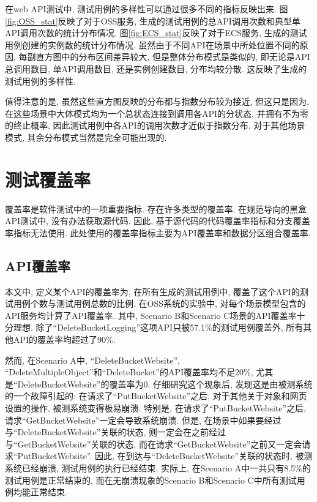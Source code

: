         在web API测试中, 测试用例的多样性可以通过很多不同的指标反映出来. 图\ref{fig:OSS_stat}反映了对于OSS服务, 生成的测试用例的总API调用次数和典型单API调用次数的统计分布情况. 图\ref{fig:ECS_stat}反映了对于ECS服务, 生成的测试用例创建的实例数的统计分布情况. 虽然由于不同API在场景中所处位置不同的原因, 每副直方图中的分布区间差异较大, 但是整体分布模式是类似的, 即无论是API总调用数目, 单API调用数目, 还是实例创建数目, 分布均较分散. 这反映了生成的测试用例的多样性.
        
        值得注意的是, 虽然这些直方图反映的分布都与指数分布较为接近, 但这只是因为, 在这些场景中大体模式均为一个总状态连接到调用各API的分状态, 并拥有不为零的终止概率, 因此测试用例中各API的调用次数才近似于指数分布. 对于其他场景模式, 其余分布模式当然是完全可能出现的.

    \section{测试覆盖率}
        覆盖率是软件测试中的一项重要指标. 存在许多类型的覆盖率. 在规范导向的黑盒API测试中, 没有办法获取源代码. 因此, 基于源代码的代码覆盖率指标和分支覆盖率指标无法使用. 此处使用的覆盖率指标主要为API覆盖率和数据分区组合覆盖率.
        
        \subsection{API覆盖率}
        
            本文中, 定义某个API的覆盖率为, 在所有生成的测试用例中, 覆盖了这个API的测试用例个数与测试用例总数的比例. 在OSS系统的实验中, 对每个场景模型包含的API服务均计算了API覆盖率. 其中, Scenario B和Scenario C场景的API覆盖率十分理想. 除了“DeleteBucketLogging”这项API只被57.1\%的测试用例覆盖外, 所有其他API的覆盖率均超过了90\%.
            
            然而, 在Scenario A中, “DeleteBucketWebsite”, “DeleteMultipleObject”和“DeleteBucket”的API覆盖率均不足20\%, 尤其是“DeleteBucketWebsite”的覆盖率为0. 仔细研究这个现象后, 发现这是由被测系统的一个故障引起的: 在请求了“PutBucketWebsite”之后, 对于其他关于对象和网页设置的操作, 被测系统变得极易崩溃. 特别是, 在请求了“PutBucketWebsite”之后, 请求“GetBucketWebsite”一定会导致系统崩溃. 但是, 在场景中如果要经过与“DeleteBucketWebsite”关联的状态, 则一定会在之前经过与“GetBucketWebsite”关联的状态, 而在请求“GetBucketWebsite”之前又一定会请求“PutBucketWebsite”. 因此, 在到达与“DeleteBucketWebsite”关联的状态时, 被测系统已经崩溃, 测试用例的执行已经结束. 实际上, 在Scenario A中一共只有8.5\%的测试用例是正常结束的, 而在无崩溃现象的Scenario B和Scenario C中所有测试用例均能正常结束.
            
